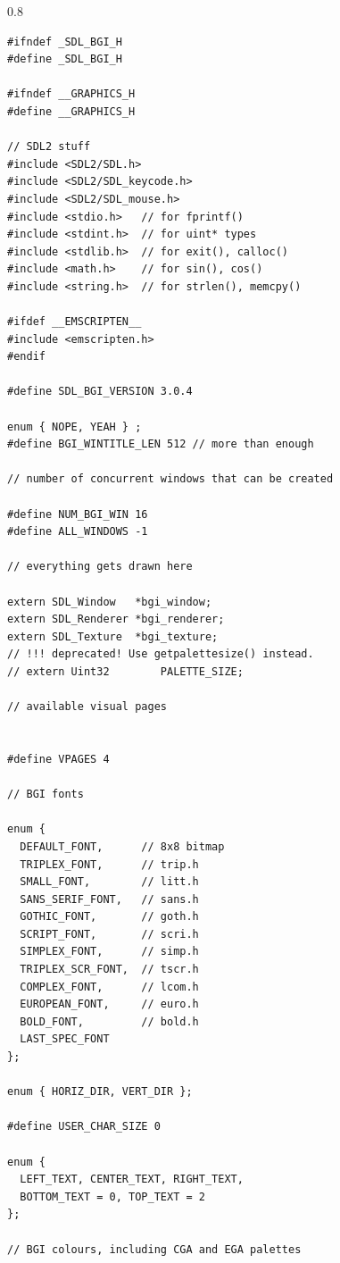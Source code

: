 \documentclass[a4paper,12pt]{article}
\newenvironment{margins}[2]
{ %
\begin{list}{}
{
\setlength{\leftmargin}{#1}
\setlength{\rightmargin}{#2}
} \item
} %
{\end{list}}
\begin{document}
\begin{margins}{-0.5cm}{-0.5cm}

\begin{spacing}{0.8}
\begin{lstlisting}
#ifndef _SDL_BGI_H
#define _SDL_BGI_H

#ifndef __GRAPHICS_H
#define __GRAPHICS_H

// SDL2 stuff
#include <SDL2/SDL.h>
#include <SDL2/SDL_keycode.h>
#include <SDL2/SDL_mouse.h>
#include <stdio.h>   // for fprintf()
#include <stdint.h>  // for uint* types
#include <stdlib.h>  // for exit(), calloc()
#include <math.h>    // for sin(), cos()
#include <string.h>  // for strlen(), memcpy()

#ifdef __EMSCRIPTEN__
#include <emscripten.h>
#endif

#define SDL_BGI_VERSION 3.0.4

enum { NOPE, YEAH } ;
#define BGI_WINTITLE_LEN 512 // more than enough

// number of concurrent windows that can be created

#define NUM_BGI_WIN 16
#define ALL_WINDOWS -1

// everything gets drawn here

extern SDL_Window   *bgi_window;
extern SDL_Renderer *bgi_renderer;
extern SDL_Texture  *bgi_texture;
// !!! deprecated! Use getpalettesize() instead.
// extern Uint32        PALETTE_SIZE;

// available visual pages


#define VPAGES 4

// BGI fonts

enum {
  DEFAULT_FONT,      // 8x8 bitmap
  TRIPLEX_FONT,      // trip.h
  SMALL_FONT,        // litt.h
  SANS_SERIF_FONT,   // sans.h
  GOTHIC_FONT,       // goth.h
  SCRIPT_FONT,       // scri.h
  SIMPLEX_FONT,      // simp.h
  TRIPLEX_SCR_FONT,  // tscr.h
  COMPLEX_FONT,      // lcom.h
  EUROPEAN_FONT,     // euro.h
  BOLD_FONT,         // bold.h
  LAST_SPEC_FONT
};

enum { HORIZ_DIR, VERT_DIR };

#define USER_CHAR_SIZE 0

enum {
  LEFT_TEXT, CENTER_TEXT, RIGHT_TEXT,
  BOTTOM_TEXT = 0, TOP_TEXT = 2
};

// BGI colours, including CGA and EGA palettes


\end{lstlisting}
\end{spacing}
\end{margins}
\end{document}
